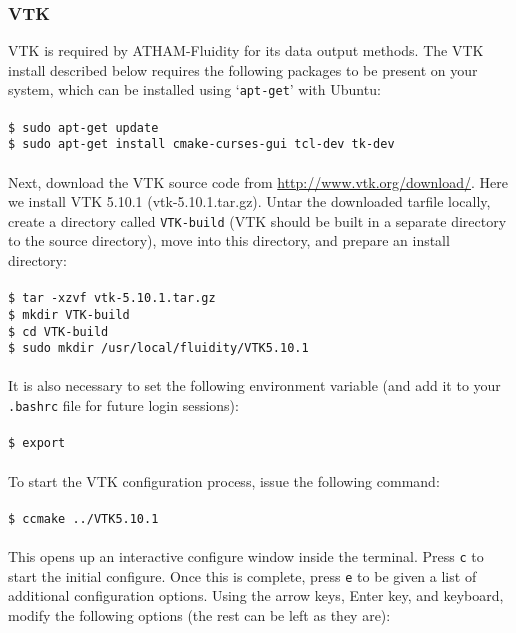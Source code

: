 \documentclass[10pt,a4paper]{article}
\newcommand\tab[1][0.5cm]{\hspace*{#1}}
\begin{document}
\subsubsection{VTK}
VTK is required by ATHAM-Fluidity for its data output methods. The VTK install described below requires the following packages to be present on your system, which can be installed using `\texttt{apt-get}' with Ubuntu:\\\\
\tab \texttt{\$ sudo apt-get update}\\
\tab \texttt{\$ sudo apt-get install cmake-curses-gui tcl-dev tk-dev}\\\\
Next, download the VTK source code from \url{http://www.vtk.org/download/}. Here we install VTK 5.10.1 (vtk-5.10.1.tar.gz). Untar the downloaded tarfile locally, create a directory called \texttt{VTK-build} (VTK should be built in a separate directory to the source directory), move into this directory, and prepare an install directory:\\\\
\tab \texttt{\$ tar -xzvf vtk-5.10.1.tar.gz}\\
\tab \texttt{\$ mkdir VTK-build}\\
\tab \texttt{\$ cd VTK-build}\\
\tab \texttt{\$ sudo mkdir /usr/local/fluidity/VTK5.10.1}\\\\
It is also necessary to set the following environment variable (and add it to your \texttt{.bashrc} file for future login sessions):\\\\
\tab \texttt{\$ export }\\\\
To start the VTK configuration process, issue the following command:\\\\
\tab \texttt{\$ ccmake ../VTK5.10.1}\\\\
This opens up an interactive configure window inside the terminal. Press \texttt{c} to start the initial configure. Once this is complete, press \texttt{e} to be given a list of additional configuration options. Using the arrow keys, Enter key, and keyboard, modify the following options (the rest can be left as they are):\\\\
\end{document}
